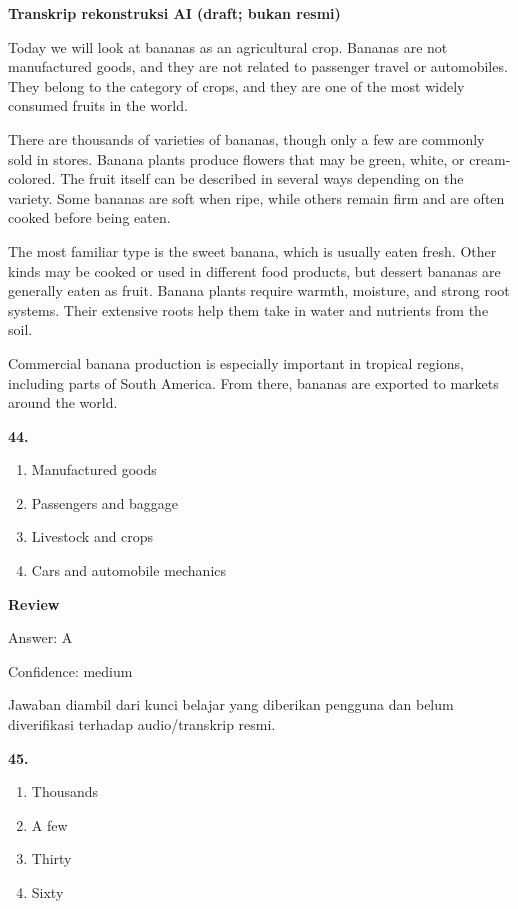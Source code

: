 \documentclass[12pt]{article}
\begin{document}
\begin{exampleblock}
\textbf{Transkrip rekonstruksi AI (draft; bukan resmi)}\par
Today we will look at bananas as an agricultural crop. Bananas are not manufactured goods, and they are not related to passenger travel or automobiles. They belong to the category of crops, and they are one of the most widely consumed fruits in the world.\par
There are thousands of varieties of bananas, though only a few are commonly sold in stores. Banana plants produce flowers that may be green, white, or cream-colored. The fruit itself can be described in several ways depending on the variety. Some bananas are soft when ripe, while others remain firm and are often cooked before being eaten.\par
The most familiar type is the sweet banana, which is usually eaten fresh. Other kinds may be cooked or used in different food products, but dessert bananas are generally eaten as fruit. Banana plants require warmth, moisture, and strong root systems. Their extensive roots help them take in water and nutrients from the soil.\par
Commercial banana production is especially important in tropical regions, including parts of South America. From there, bananas are exported to markets around the world.\par
\end{exampleblock}
\noindent\textbf{44.}
\begin{enumerate}[label=(\Alph*),leftmargin=*,itemsep=0.2em]
\item Manufactured goods
\item Passengers and baggage
\item Livestock and crops
\item Cars and automobile mechanics
\end{enumerate}
\par
\begingroup
\setlength{\parskip}{0pt}
\setlength{\parindent}{0pt}
\textbf{Review}\par
Answer: A\par
Confidence: medium\par
Jawaban diambil dari kunci belajar yang diberikan pengguna dan belum diverifikasi terhadap audio/transkrip resmi.\par
\endgroup
\par
\vspace{0.25\baselineskip}
\noindent\textbf{45.}
\begin{enumerate}[label=(\Alph*),leftmargin=*,itemsep=0.2em]
\item Thousands
\item A few
\item Thirty
\item Sixty
\end{enumerate}
\end{document}
